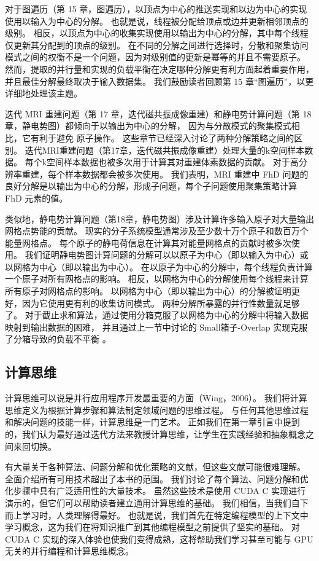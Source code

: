 对于图遍历（第 15 章，图遍历），以顶点为中心的推送实现和以边为中心的实现使用以输入为中心的分解。 
也就是说，线程被分配给顶点或边并更新相邻顶点的级别。 
相反，以顶点为中心的收集实现使用以输出为中心的分解，其中每个线程仅更新其分配到的顶点的级别。 
在不同的分解之间进行选择时，分散和聚集访问模式之间的权衡不是一个问题，因为对级别值的更新是幂等的并且不需要原子。 
然而，提取的并行量和实现的负载平衡在决定哪种分解更有利方面起着重要作用，并且最佳分解最终取决于输入数据集。 
我们鼓励读者回顾第 15 章“图遍历”，以更详细地处理该主题。

迭代 MRI 重建问题（第 17 章，迭代磁共振成像重建）和静电势计算问题（第 18 章，静电势图）都倾向于以输出为中心的分解，
因为与分散模式的聚集模式相比，它有利于避免 原子操作。 这些章节已经深入讨论了两种分解策略之间的区别。 
迭代MRI重建问题（第17章，迭代磁共振成像重建）处理大量的k空间样本数据。 
每个k空间样本数据也被多次用于计算其对重建体素数据的贡献。 对于高分辨率重建，每个样本数据都会被多次使用。 
我们表明，MRI 重建中 FhD 问题的良好分解是以输出为中心的分解，形成子问题，每个子问题使用聚集策略计算 FhD 元素的值。

类似地，静电势计算问题（第18章，静电势图）涉及计算许多输入原子对大量输出网格点势能的贡献。 
现实的分子系统模型通常涉及至少数十万个原子和数百万个能量网格点。 
每个原子的静电荷信息在计算其对能量网格点的贡献时被多次使用。 
我们证明静电势图计算问题的分解可以以原子为中心（即以输入为中心）或以网格为中心（即以输出为中心）。 
在以原子为中心的分解中，每个线程负责计算一个原子对所有网格点的影响。 
相反，以网格为中心的分解使用每个线程来计算所有原子对网格点的影响。 
以网格为中心（即以输出为中心）的分解被证明更好，因为它使用更有利的收集访问模式。 两种分解所暴露的并行性数量就足够了。 
对于截止求和算法，通过使用分箱克服了以网格为中心的分解中将输入数据映射到输出数据的困难，
并且通过上一节中讨论的 Small箱子-Overlap 实现克服了分箱导致的负载不平衡 。

\subsection{计算思维}
计算思维可以说是并行应用程序开发最重要的方面（Wing，2006）。 
我们将计算思维定义为根据计算步骤和算法制定领域问题的思维过程。 
与任何其他思维过程和解决问题的技能一样，计算思维是一门艺术。 
正如我们在第一章引言中提到的，我们认为最好通过迭代方法来教授计算思维，让学生在实践经验和抽象概念之间来回切换。

有大量关于各种算法、问题分解和优化策略的文献，但这些文献可能很难理解。 全面介绍所有可用技术超出了本书的范围。 
我们讨论了每个算法、问题分解和优化步骤中具有广泛适用性的大量技术。 
虽然这些技术是使用 CUDA C 实现进行演示的，但它们可以帮助读者建立通用计算思维的基础。 
我们相信，当我们自下而上学习时，人类理解得最好。 
也就是说，我们首先在特定编程模型的上下文中学习概念，这为我们在将知识推广到其他编程模型之前提供了坚实的基础。 
对 CUDA C 实现的深入体验也使我们变得成熟，这将帮助我们学习甚至可能与 GPU 无关的并行编程和计算思维概念。

